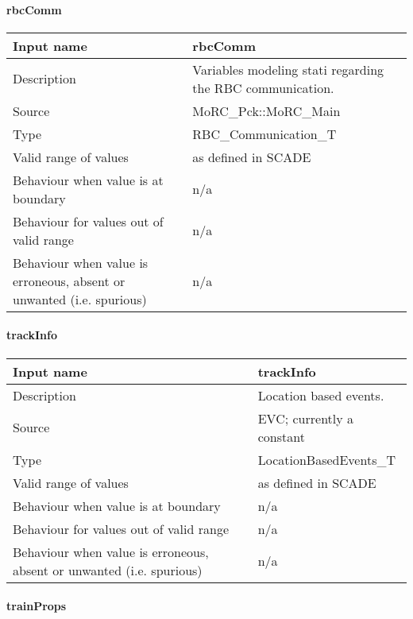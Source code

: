 \paragraph{rbcComm}

\begin{longtable}{p{}p{}}
\toprule
Input name				& rbcComm \\
\midrule
Description				& Variables modeling stati regarding the RBC communication. \\
\midrule
Source					& MoRC\_Pck::MoRC\_Main \\ 
\midrule
Type					& RBC\_Communication\_T \\
\midrule
Valid range of values	& as defined in SCADE \\
\midrule
Behaviour when value is at boundary	& n/a \\
\midrule
Behaviour for values out of valid range	& n/a \\
\midrule
Behaviour when value is erroneous, absent or unwanted (i.e. spurious) & n/a \\
\bottomrule
\end{longtable}

\paragraph{trackInfo}

\begin{longtable}{p{}p{}}
\toprule
Input name				& trackInfo \\
\midrule
Description				& Location based events. \\
\midrule
Source					& EVC; currently a constant \\ 
\midrule
Type					& LocationBasedEvents\_T \\
\midrule
Valid range of values	& as defined in SCADE \\
\midrule
Behaviour when value is at boundary	& n/a \\
\midrule
Behaviour for values out of valid range	& n/a \\
\midrule
Behaviour when value is erroneous, absent or unwanted (i.e. spurious) & n/a \\
\bottomrule
\end{longtable}

\paragraph{trainProps}


